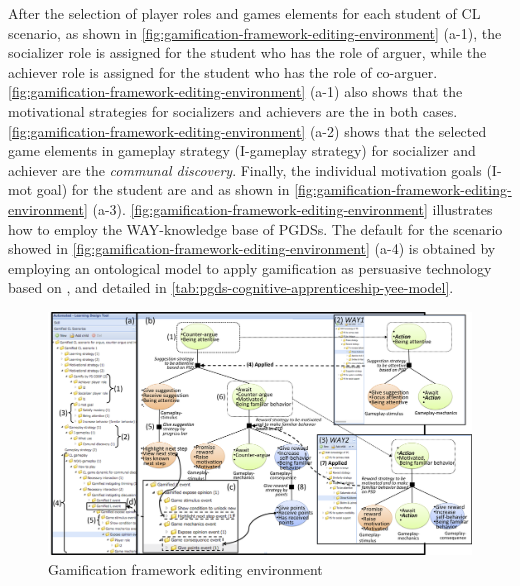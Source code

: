 After the selection of player roles and games elements for each student of CL scenario, as shown in \autoref{fig:gamification-framework-editing-environment} (a-1), the socializer role is assigned for the student  who has the role of arguer, while the achiever role is assigned for the student  who has the role of co-arguer.
\autoref{fig:gamification-framework-editing-environment} (a-1) also shows that the motivational strategies for socializers and achievers are the  in both cases.
\autoref{fig:gamification-framework-editing-environment} (a-2) shows that the selected game elements in gameplay strategy (I-gameplay strategy) for socializer and achiever are the \emph{communal discovery}. Finally, the individual motivation goals (I-mot goal) for the student  are   and  as shown in \autoref{fig:gamification-framework-editing-environment} (a-3).
\autoref{fig:gamification-framework-editing-environment} illustrates how to employ the WAY-knowledge base of PGDSs.
 The default for the scenario showed in \autoref{fig:gamification-framework-editing-environment} (a-4) is obtained by employing an ontological model to apply gamification as persuasive technology based on , and detailed in \autoref{tab:pgds-cognitive-apprenticeship-yee-model}.


\begin{landscape}
 \begin{figure}[htb]
 \caption{Gamification framework editing environment}
 \label{fig:gamification-framework-editing-environment}
 \centering
 \includegraphics[width=1.5\textwidth]{images/chap-mechanisms-procedures/gamification-framework-editing-environment.png}
 \fautor
 \end{figure}
\end{landscape}

